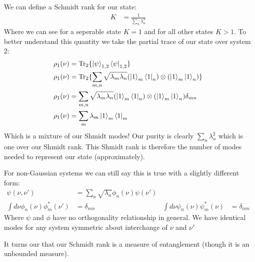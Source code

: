 We can define a Schmidt rank for our state:
\begin{align*}
	K &= \frac{1}{\sum_n \lambda_n^2}
\end{align*}
Where we can see for a seperable state $K=1$ and for all other states $K>1$. To better understand this quantity we take the partial trace of our state over system 2:
\begin{align*}
	\rho_1(\nu) &= \Tr_2\{\ket{\psi}_{1,2}\bra{\psi}_{1,2}\} \\
	\rho_1(\nu) &= \Tr_2\{\sum_{m,n} \sqrt{\lambda_m\lambda_n} (\ket{1}_m \bra{1}_n)\otimes(\ket{1}_m\ket{1}_n)\} \\
	\rho_1(\nu) &= \sum_{m,n} \sqrt{\lambda_m\lambda_n} (\ket{1}_m \bra{1}_n)\otimes(\ket{1}_m\ket{1}_n) \delta_{mn} \\
	\rho_1(\nu) &= \sum_{m} \lambda_m \ket{1}_m \bra{1}_m
\end{align*}
Which is a mixture of our Shmidt modes! Our purity is clearly $\sum_n \lambda_n^2$ which is one over our Shmidt rank. This Shmidt rank is therefore the number of modes needed to represent our state (approximately). 

For non-Gaussian systems we can still say this is true with a slightly different form:
\begin{align*}
	\psi(\nu,\nu') &= \sum_n \sqrt{\lambda_n} \phi_n(\nu)\psi(\nu') \\
	\int d\nu \phi_n(\nu)\phi_m^*(\nu') &= \delta_{mn} & \int d\nu \psi_n(\nu)\psi_m^*(\nu) &= \delta_{nm}
\end{align*}
Where $\psi$ and $\phi$ have no orthogonality relationship in general. We have identical modes for any system symmetric about interchange of $\nu$ and $\nu'$

It turns our that our Schmidt rank is a measure of entanglement (though it is an unbounded measure).
